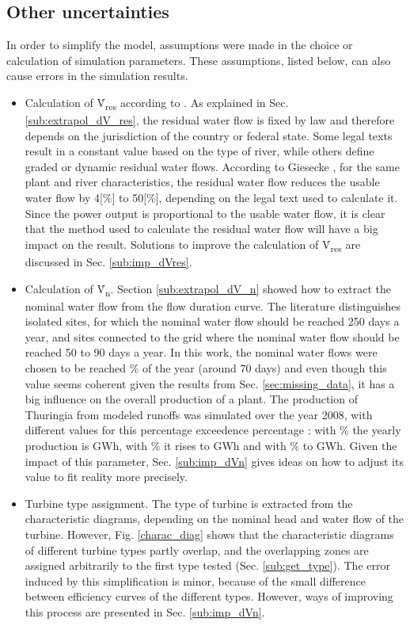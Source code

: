 \subsection{Other uncertainties}
\label{sub:limits_others}

In order to simplify the model, assumptions were made in the choice or calculation of simulation parameters. These assumptions, listed below, can also cause errors in the simulation results. 
\begin{itemize}
 \item Calculation of \.V\textsubscript{res} according to \cite{pacer}. As explained in Sec. \ref{sub:extrapol_dV_res}, the residual water flow is fixed by law and therefore depends on the jurisdiction of the country or federal state. Some legal texts result in a constant value based on the type of river, while others define graded or dynamic residual water flows. According to Giesecke \cite{gies_qrest}, for the same plant and river characteristics, the residual water flow reduces the usable water flow by \unit{4}[\%] to \unit{50}[\%], depending on the legal text used to calculate it. Since the power output is proportional to the usable water flow, it is clear that the method used to calculate the residual water flow will have a big impact on the result. Solutions to improve the calculation of \.V\textsubscript{res} are discussed in Sec. \ref{sub:imp_dVres}.
 \item Calculation of \.V\textsubscript{n}. Section \ref{sub:extrapol_dV_n} showed how to extract the nominal water flow from the flow duration curve. The literature distinguishes isolated sites, for which the nominal water flow should be reached 250 days a year, and sites connected to the grid where the nominal water flow should be reached 50 to 90 days a year. In this work, the nominal water flows were chosen to be reached \unit[20]{\%} of the year (around 70 days) and even though this value seems coherent given the results from Sec. \ref{sec:missing_data}, it has a big influence on the overall production of a plant. The production of Thuringia from modeled runoffs was simulated over the year 2008, with different values for this percentage exceedence percentage :  with \unit[20]{\%} the yearly production is \unit[187]{GWh}, with \unit[30]{\%} it rises to \unit[210]{GWh} and with \unit[40]{\%} to \unit[223]{GWh}. Given the impact of this parameter, Sec. \ref{sub:imp_dVn} gives ideas on how to adjust its value to fit reality more precisely.
 \item Turbine type assignment. The type of turbine is extracted from the characteristic diagrams, depending on the nominal head and water flow of the turbine. However, Fig. \ref{charac_diag} shows that the characteristic diagrams of different turbine types partly overlap, and the overlapping zones are assigned arbitrarily to the first type tested (Sec. \ref{sub:get_type}). The error induced by this simplification is minor, because of the small difference between efficiency curves of the different types. However, ways of improving this process are presented in Sec. \ref{sub:imp_dVn}.

\end{itemize}
